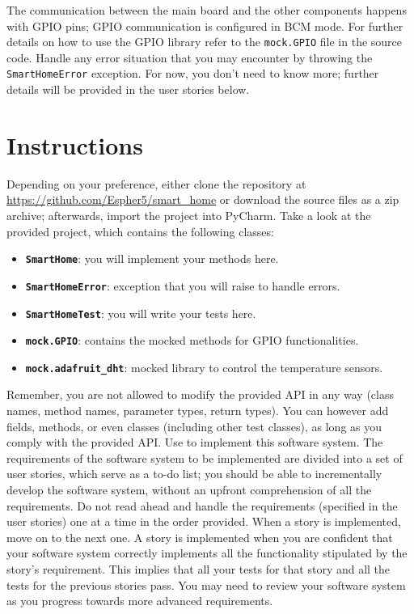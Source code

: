 The communication between the main board and the other components happens with GPIO pins; GPIO communication is configured in BCM mode. For further details on how to use the GPIO library refer to the \texttt{mock.GPIO} file in the source code.
Handle any error situation that you may encounter by throwing the \texttt{SmartHomeError} exception.
For now, you don't need to know more; further details will be provided in the user stories below.


\section{Instructions}
Depending on your preference, either clone the repository at \url{https://github.com/Espher5/smart_home} or download the source files as a zip archive; afterwards, import the project into PyCharm. 
Take a look at the provided project, which contains the following classes: 
\begin{itemize}
    \item \textbf{\texttt{SmartHome}}: you will implement your methods here.
    \item \textbf{\texttt{SmartHomeError}}: exception that you will raise to handle errors.
    \item \textbf{\texttt{SmartHomeTest}}: you will write your tests here.
    \item \textbf{\texttt{mock.GPIO}}: contains the mocked methods for GPIO functionalities.
    \item \textbf{\texttt{mock.adafruit\_dht}}: mocked library to control the temperature sensors.
\end{itemize}

Remember, you are not allowed to modify the provided API in any way (\ie class names, method names, parameter types, return types). You can however add fields, methods, or even classes (including other test classes), as long as you comply with the provided API.
Use \tdd to implement this software system.
The requirements of the software system to be implemented are divided into a set of user stories, which serve as a to-do list; you should be able to incrementally develop the software system, without an upfront comprehension of all the requirements. Do not read ahead and handle the requirements (\ie specified in the user stories) one at a time in the order provided.
When a story is implemented, move on to the next one. A story is
implemented when you are confident that your software system correctly implements all the functionality stipulated by the story's requirement. This implies that all your tests for that story and all the tests for the previous stories pass. You may need to review your software system as you progress towards more advanced requirements.


